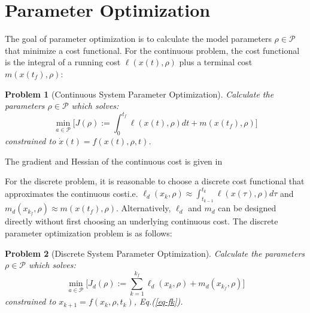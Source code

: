 \documentclass[letterpaper, 10pt, conference]{ieeeconf}
\newtheorem{problem}{Problem}
\begin{document}

\section{Parameter Optimization}
\label{sec-opt}
The goal of parameter optimization is to calculate the model parameters $\rho\in\mathcal{P}$ that minimize a cost functional.  For the continuous problem, the cost functional is the integral of a running cost $\ell(x(t),\rho)$ plus a terminal cost $m(x(t_f),\rho)$:
\begin{problem}[Continuous System Parameter Optimization]
Calculate the parameters $\rho\in\mathcal{P}$ which solves:
\[
\min_{a\in\mathcal{P}} \Big[J(\rho):=\int_0^{t_f}\ell(x(t),\rho)dt + m(x(t_f),\rho)\Big]
\]
constrained to $\dot{x}(t) = f(x(t),\rho,t)$.
\end{problem}
The gradient and Hessian of the continuous cost is given in \cite{miller_murphey}

For the discrete problem, it is reasonable to choose a discrete cost functional that approximates the continuous cost\textemdash i.e. $\ell_d(x_{k},\rho)\approx\int_{t_{k-1}}^{t_{k}}\ell(x(\tau),\rho)d\tau$ and $m_d(x_{k_f},\rho)\approx m(x(t_f),\rho)$.  Alternatively, $\ell_d$ and $m_d$ can be designed directly without first choosing an underlying continuous cost.  The discrete parameter optimization problem is as follows:
\begin{problem}[Discrete System Parameter Optimization]
Calculate the parameters $\rho\in\mathcal{P}$ which solves:
\[
\min_{a\in\mathcal{P}} \Big[J_d(\rho):=\sum_{k=1}^{k_f}\ell_d(x_k,\rho) + m_d(x_{k_f},\rho)\Big]
\]
constrained to $x_{k+1} = f(x_k,\rho,t_k)$, Eq.(\ref{eq-fk}).
\label{prob-disc}
\end{problem}
\end{document}
